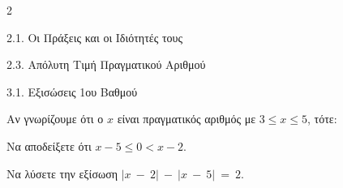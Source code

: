 \begin{ylh}{2}
    \item 2.1. Οι Πράξεις και οι Ιδιότητές τους
    \item 2.3. Απόλυτη Τιμή Πραγματικού Αριθμού
    \item 3.1. Εξισώσεις 1ου Βαθμού
\end{ylh}
Αν γνωρίζουμε ότι ο $x$ είναι πραγματικός αριθμός με $3 \leq x \leq 5$, τότε:
\begin{alist}
\item Να αποδείξετε ότι $x - 5 \leq 0 < x - 2$.
\item Να λύσετε την εξίσωση $|x\  - \ 2|\  - \ |x\  - \ 5|\  = \ 2$.
\end{alist}

